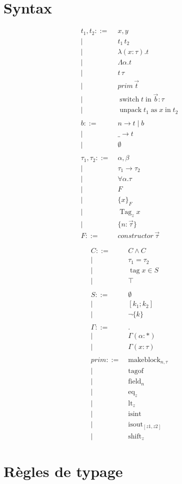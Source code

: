 \documentclass{article}
\newcommand\term{t}
\newcommand\ty{\tau}
\newcommand\tyenv{\Gamma}
\newcommand\var{x}
\newcommand\tyvar{\alpha}
\newcommand\binding[2]{(#1 : #2)}
\newcommand\kw[1]{\operatorname{#1}}
\newcommand\syn[1]{#1 ::=& \; }
\newcommand\synor{\\ |& \; }
\begin{document}
\newcommand\pator{\;|\;}

\newcommand\redto[2]{#1 \longrightarrow #2}

\section{Syntax}

\begin{multicols}{2}
\begin{align*}
  \syn{\term_1, \term_2} \var, y
  \synor      \term_1 \, \term_2
  \synor      \lambda \binding{\var}{\ty} . \term
  \synor      \Lambda \tyvar . \term
  \synor      \term \, \ty
  \synor      prim \, \vec{\term}
  \synor      \kw{switch} \term \kw{in} \vec{b} : \ty
  \synor      \kw{unpack} \term_1 \kw{as} \var \kw{in} \term_2
%
  \\ \\
%
  \syn{b} n \rightarrow \term \; | \; b
  \synor  \_ \rightarrow \term
  \synor  \emptyset
%
  \\ \\
%
  \syn{\ty_1, \ty_2} \tyvar, \beta
  \synor  \ty_1 \rightarrow \ty_2
  \synor  \forall \tyvar. \ty
  \synor  F
  \synor  \{ \var \}_F
  \synor  \kw{Tag}_z \var
  \synor  \{ n: \vec{\ty} \}
  \\
  \syn{F} constructor \, \vec{\ty}
\end{align*}
   
\begin{align*}
  \syn{C} C \wedge C
  \synor  \ty_1 = \ty_2
  \synor  \kw{tag} \var \in S
  \synor  \top
%
  \\ \\
%
  \syn{S} \emptyset
  \synor  [ k_1 ; k_2 ]
  \synor  \lnot \{ k \}
%
  \\ \\
%
  \syn{\tyenv} .
  \synor \tyenv \binding{\alpha}{*}
  \synor \tyenv \binding{\var}{\ty}
%
  \\ \\
%
  \syn{prim} \kw{makeblock}_{n,\ty}
  \synor \kw{tagof}
  \synor \kw{field}_{n}
  \synor \kw{eq}_{z}
  \synor \kw{lt}_{z}
  \synor \kw{isint}
  \synor \kw{isout}_{[z1,z2]}
  \synor \kw{shift}_{z}
\end{align*}
\end{multicols}

\section{Règles de typage}
\end{document}

